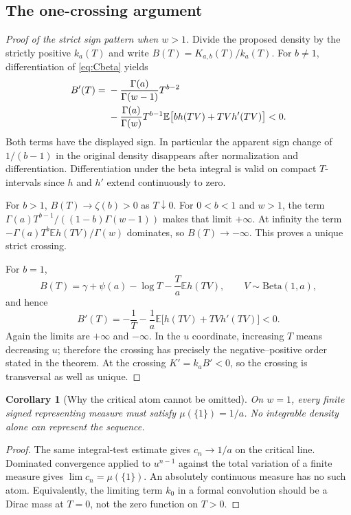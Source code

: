 \documentclass[11pt]{article}
\numberwithin{equation}{section}
\newtheorem{corollary}[theorem]{Corollary}
\theoremstyle{definition}\newtheorem{definition}[theorem]{Definition}
\theoremstyle{remark}\newtheorem{remark}[theorem]{Remark}
\newcommand{\E}{\mathbb E}
\begin{document}
\subsection{The one-crossing argument}
\begin{proof}[Proof of the strict sign pattern when $w>1$]
Divide the proposed density by the strictly positive $k_a(T)$ and
write $B(T)=K_{a,b}(T)/k_a(T)$. For $b\ne1$, differentiation of
\eqref{eq:Cbeta} yields
\begin{align}\label{eq:Bprime}
 B'(T)={}&-\frac{\Gamma(a)}{\Gamma(w-1)}T^{b-2}\notag\\
 &-\frac{\Gamma(a)}{\Gamma(w)}T^{b-1}
 \E\bigl[b h(TV)+TVh'(TV)\bigr]<0.
\end{align}
Both terms have the displayed sign. In particular the apparent
sign change of $1/(b-1)$ in the original density disappears after
normalization and differentiation. Differentiation under the beta
integral is valid on compact $T$-intervals since $h$ and $h'$ extend
continuously to zero.

For $b>1$, $B(T)\to\zeta(b)>0$ as $T\downarrow0$.
For $0<b<1$ and $w>1$, the term
$\Gamma(a)T^{b-1}/((1-b)\Gamma(w-1))$ makes that limit $+\infty$.
At infinity the term $-\Gamma(a)T^b\E h(TV)/\Gamma(w)$ dominates,
so $B(T)\to-\infty$. This proves a unique strict crossing.

For $b=1$,
\[
 B(T)=\gamma+\psi(a)-\log T-\frac{T}{a}\E h(TV),
 \qquad V\sim\mathrm{Beta}(1,a),
\]
and hence
\begin{equation}\label{eq:Bprime1}
 B'(T)=-\frac1T-\frac1a\E\bigl[h(TV)+TVh'(TV)\bigr]<0.
\end{equation}
Again the limits are $+\infty$ and $-\infty$.
In the $u$ coordinate, increasing $T$ means decreasing $u$;
therefore the crossing has precisely the negative--positive order
stated in the theorem. At the crossing $K'=k_aB'<0$, so the crossing
is transversal as well as unique.
\end{proof}

\begin{corollary}[Why the critical atom cannot be omitted]\label{cor:atom}
On $w=1$, every finite signed representing measure must satisfy
$\mu(\{1\})=1/a$. No integrable density alone can represent the sequence.
\end{corollary}
\begin{proof}
The same integral-test estimate gives $c_n\to1/a$ on the critical
line. Dominated convergence applied to $u^{n-1}$ against the total
variation of a finite measure gives
$\lim c_n=\mu(\{1\})$. An absolutely continuous measure has no such atom.
Equivalently, the limiting term $k_0$ in a formal convolution should
be a Dirac mass at $T=0$, not the zero function on $T>0$.
\end{proof}
\end{document}
